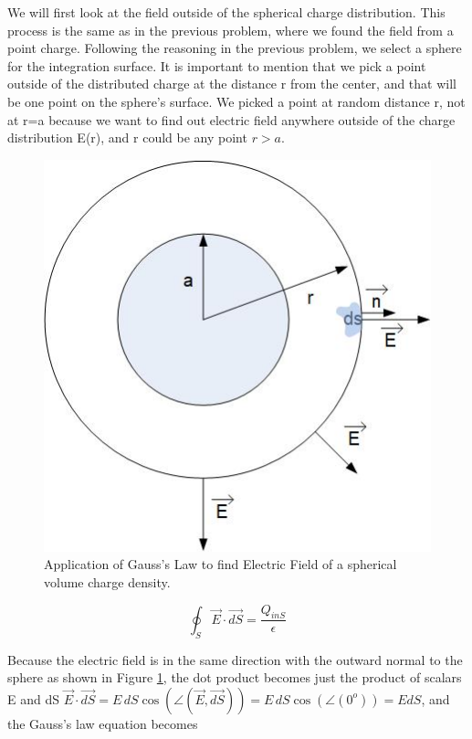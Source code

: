 \documentclass{ximera}
\begin{document}
We will first look at the field outside of the spherical charge distribution. This process is the same as in the previous problem, where we found the field from a point charge. Following the reasoning in the previous problem, we select a sphere for the integration surface. It is important to mention that we pick a point outside of the distributed charge at the distance r from the center, and that will be one point on the sphere's surface. We picked a point at random distance r, not at r=a because we want to find out electric field anywhere outside of the charge distribution E(r), and r could be any point $r>a$. 

\begin{figure}[htbp]
\begin{center}
\includegraphics[scale=0.6]{../jpg/gaussSphereOut.jpg}
\end{center}
\caption{Application of Gauss's Law to find Electric Field of a spherical volume charge density.}
\label{fig:GaussSphereOut}
\end{figure}



\begin{equation}
\oint_S \vec{E} \cdot \vec{dS} = \frac{Q_{inS}}{\epsilon}
\end{equation}

Because the electric field is in the same direction with the outward normal to the sphere as shown in Figure \ref{fig:GaussSphereOut}, the dot product becomes just the product of scalars E and dS $\vec{E} \cdot \vec{dS}= E \,dS  \cos(\angle(\vec{E},\vec{dS}))= E \,dS  \cos(\angle(0^o)) =E dS$, and the Gauss's law equation becomes 
\end{document}
